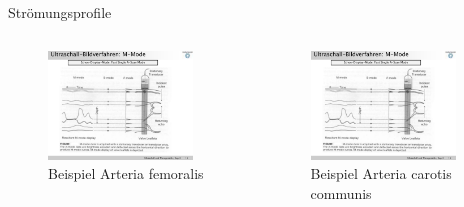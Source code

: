 \documentclass{beamer}
\begin{document}
\begin{frame}{Strömungsprofile}
\begin{columns}
		\begin{figure}[h]
			\includegraphics[page=2,trim = 45mm 77mm 140mm 45mm, clip=true,width=0.9\textwidth]{vortrag/Vortrag.pdf}
			\caption{Beispiel Arteria femoralis}
		\end{figure}
		\begin{figure}[h]
			\includegraphics[page=2,trim = 120mm 77mm 60mm 45mm, clip=true,width=0.9\textwidth]{vortrag/Vortrag.pdf}
			\caption{Beispiel Arteria carotis communis}
		\end{figure}
\end{columns}
\end{frame}
\end{document}
